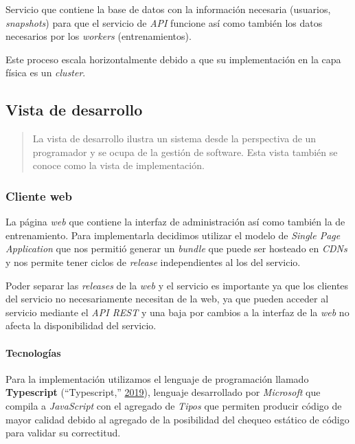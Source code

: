 \documentclass[12pt,a4paper,]{scrartcl}
\let\oldparagraph\paragraph
\renewcommand{\paragraph}[1]{\oldparagraph{#1}\mbox{}}
\begin{document}
Servicio que contiene la base de datos con la información necesaria (usuarios, \emph{snapshots}) para que el servicio de \emph{API} funcione así como también los datos necesarios por los \emph{workers} (entrenamientos).

Este proceso escala horizontalmente debido a que su implementación en la capa física es un \emph{cluster}.

\hypertarget{vista-de-desarrollo}{%
\subsection{Vista de desarrollo}\label{vista-de-desarrollo}}

\begin{quote}
La vista de desarrollo ilustra un sistema desde la perspectiva de un programador y se ocupa de la gestión de software.
Esta vista también se conoce como la vista de implementación.
\end{quote}

\hypertarget{cliente-web-1}{%
\subsubsection{Cliente web}\label{cliente-web-1}}

La página \emph{web} que contiene la interfaz de administración así como también la de entrenamiento. Para implementarla decidimos utilizar el modelo de \emph{Single Page Application} que nos permitió generar un \emph{bundle} que puede ser hosteado en \emph{CDNs} y nos permite tener ciclos de \emph{release} independientes al los del servicio.

Poder separar las \emph{releases} de la \emph{web} y el servicio es importante ya que los clientes del servicio no necesariamente necesitan de la web, ya que pueden acceder al servicio mediante el \emph{API REST} y una baja por cambios a la interfaz de la \emph{web} no afecta la disponibilidad del servicio.

\hypertarget{tecnologuxedas}{%
\paragraph{Tecnologías}\label{tecnologuxedas}}

Para la implementación utilizamos el lenguaje de programación llamado \textbf{Typescript} (``Typescript,'' \protect\hyperlink{ref-typescript}{2019}), lenguaje desarrollado por \emph{Microsoft} que compila a \emph{JavaScript} con el agregado de \emph{Tipos} que permiten producir código de mayor calidad debido al agregado de la posibilidad del chequeo estático de código para validar su correctitud.
\end{document}
